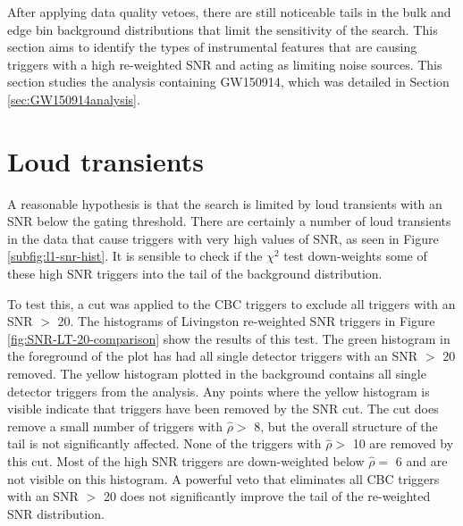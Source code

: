 After applying data quality vetoes, there are still noticeable tails in the bulk and edge bin
background distributions that limit the sensitivity of the search. This section aims to identify
the types of instrumental features that are causing triggers with a high re-weighted SNR
and acting as limiting noise sources. This section studies the analysis containing GW150914, which
was detailed in Section \ref{sec:GW150914analysis}.

\section{Loud transients}

A reasonable hypothesis is that the search is limited by loud transients with an SNR below the
gating threshold. There are certainly a number of loud transients in the data that cause triggers
with very high values of SNR, as seen in Figure \ref{subfig:l1-snr-hist}. It is sensible to check if
the $\chi^{2}$ test down-weights some of these high SNR triggers into the tail of the background
distribution.

To test this, a cut was applied to the CBC triggers to exclude all triggers with an SNR
$>$ 20. The histograms of Livingston re-weighted SNR triggers in Figure \ref{fig:SNR-LT-20-comparison}
show the results of this test.
The green histogram in the foreground of the plot has had all single detector triggers
with an SNR $>$ 20 removed.
The yellow histogram plotted in the background contains all single detector triggers from the analysis.
Any points where the yellow histogram is visible indicate that triggers have been removed by the SNR
cut.
The cut does remove a small number of triggers with  $\hat{\rho} >$ 8, but the overall structure of
the tail is not significantly affected. None of the triggers with $\hat{\rho} >$ 10 are removed by
this cut. Most of the high SNR triggers are down-weighted below $\hat{\rho} =$ 6 and are not visible on
this histogram. A powerful veto that eliminates all CBC triggers
with an SNR $>$ 20 does not significantly improve the tail of the re-weighted SNR distribution.

